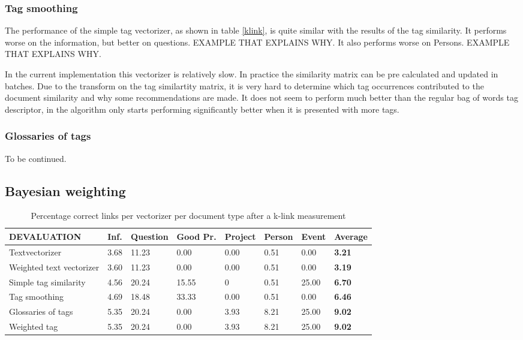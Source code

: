 \subsubsection{Tag smoothing}
The performance of the simple tag vectorizer, as shown in table \ref{klink}, is quite similar with the results of the tag similarity. It performs worse on the information, but better on questions. EXAMPLE THAT EXPLAINS WHY. It also performs worse on Persons. EXAMPLE THAT EXPLAINS WHY. 

In the current implementation this vectorizer is relatively slow. In practice the similarity matrix can be pre calculated and updated in batches. Due to the transform on the tag similartity matrix, it is very hard to determine which tag occurrences contributed to the document similarity and why some recommendations are made. It does not seem to perform much better than the regular bag of words tag descriptor, in \citeauthor{zhou2011web} the algorithm only starts performing significantly better when it is presented with more tags.

\subsubsection{Glossaries of tags}
To be continued.

\subsection{Bayesian weighting}
\begin{table}
\begin{tabular}{| l | l | l | l | l | l | l | l |}
\hline
DEVALUATION & Inf. &  Question &  Good Pr.& Project & Person &  Event & {\bf Average} \\
\hline
Textvectorizer & 3.68 & 11.23 & 0.00 & 0.00 & 0.51 & 0.00 & {\bf 3.21}\\
Weighted text vectorizer & 3.60 & 11.23 & 0.00 & 0.00 & 0.51 & 0.00 & {\bf 3.19} \\ 
Simple tag similarity & 4.56 & 20.24 & 15.55 & 0 & 0.51 & 25.00 & {\bf 6.70}\\
Tag smoothing & 4.69 & 18.48 & 33.33 & 0.00 & 0.51 & 0.00 & {\bf 6.46}\\
Glossaries of tags & 5.35 & 20.24 & 0.00 & 3.93 & 8.21 & 25.00 & {\bf 9.02}\\
Weighted tag & 5.35 & 20.24 & 0.00 & 3.93 & 8.21 & 25.00 & {\bf 9.02}\\
\hline
\end{tabular}
\caption{Percentage correct links per vectorizer per document type after a k-link measurement}
\label{bayes_table1}
\end{table}

